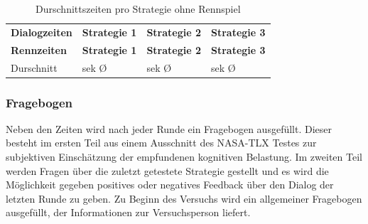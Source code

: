 \documentclass[12pt,a4paper]{scrartcl}
\begin{document}
\begin{longtable}{p{3cm}p{3cm}p{3cm}p{3cm} }
	\label{DialogzeitenKCL}\\
	\caption[Durschnittszeiten pro Strategie]{Durschnittszeiten pro Strategie ohne Rennspiel}\\
	\hline
	\textbf{Dialogzeiten}&\textbf{Strategie 1}&\textbf{Strategie 2} &\textbf{Strategie 3}\\
	\hline
	\endfirsthead
	\hline
	\textbf{Rennzeiten}&\textbf{Strategie 1}&\textbf{Strategie 2} &\textbf{Strategie 3}\\
	\hline
	\endhead
Durschnitt & sek \O & sek \O & sek \O \\


\hline
\end{longtable}

\subsubsection{Fragebogen}
\label{fragebogen}
Neben den Zeiten wird nach jeder Runde ein Fragebogen ausgefüllt. Dieser besteht im ersten Teil aus einem Ausschnitt des NASA-TLX Testes zur subjektiven Einschätzung der empfundenen kognitiven Belastung. Im zweiten Teil werden Fragen über die zuletzt getestete Strategie gestellt und es wird die Möglichkeit gegeben positives oder negatives Feedback über den Dialog der letzten Runde zu geben. Zu Beginn des Versuchs wird ein allgemeiner Fragebogen ausgefüllt, der Informationen zur Versuchsperson liefert. 
\end{document}
